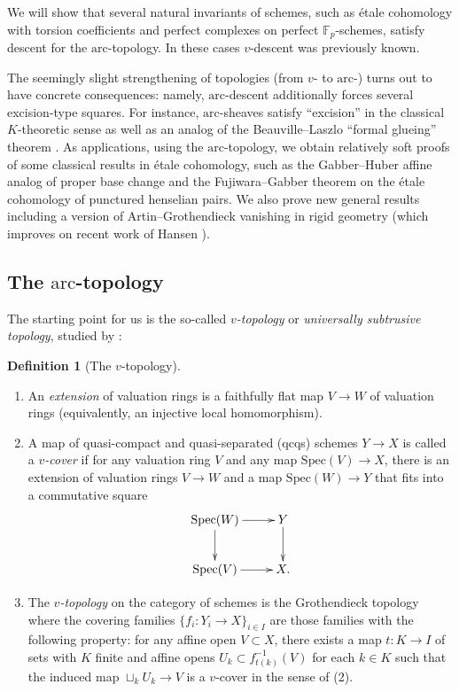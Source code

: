 \documentclass[reqno]{amsart}
\newcommand{\arc}{\mathrm{arc}}
\theoremstyle{definition}
\newtheorem{definition}[theorem]{Definition}
\begin{document}
We will show that several natural invariants of
schemes, such as \'etale cohomology with torsion coefficients and perfect
complexes on perfect $\mathbb{F}_p$-schemes,   
satisfy descent for the $\arc$-topology. In these cases $v$-descent was previously known. 

The seemingly slight strengthening of topologies (from $v$- to $\arc$-)
turns out to have concrete consequences: 
namely, $\arc$-descent additionally forces several excision-type squares.
For instance, $\arc$-sheaves  satisfy ``excision'' in the
classical $K$-theoretic sense as well as an analog of the Beauville--Laszlo ``formal glueing'' theorem \cite{BeauvilleLaszlo}.
As applications, using the $\arc$-topology, we obtain relatively soft proofs of some classical results in \'etale
cohomology, such as the Gabber--Huber affine analog of proper base change and the
Fujiwara--Gabber theorem on the \'etale cohomology of punctured henselian pairs.
We also prove new general results including a version of Artin--Grothendieck vanishing in rigid geometry (which improves on recent work of Hansen \cite{HansenArtin}). 




\subsection{The $\arc$-topology}



The starting point for us is the so-called \emph{$v$-topology} or
\emph{universally subtrusive topology}, studied by \cite{Rydh, BhattScholzeWitt}: 
\begin{definition}[The $v$-topology] 
\label{vcover}
\begin{enumerate}
\item An \emph{extension} of valuation rings is a faithfully flat map $V \to W$ of
valuation rings (equivalently, an injective local homomorphism).

\item A map of quasi-compact and quasi-separated (qcqs) schemes $Y \to X$ is called a \emph{$v$-cover} if 
for any valuation ring $V$ and any map $\mathrm{Spec} (V) \to X$, there is an extension of
valuation rings $V \to W$ and a map $\mathrm{Spec} (W) \to Y$ that fits into a commutative
square
\begin{equation}  
\label{commsquarev} \xymatrix{
\mathrm{Spec} (W) \ar[d] \ar[r] &   Y \ar[d]  \\
\mathrm{Spec} (V) \ar[r] &  X.}
\end{equation}

\item The {\em $v$-topology} on the category of schemes is the Grothendieck
topology where the covering families $\{f_i \colon Y_i \to X\}_{i \in I}$ are those
families with the following property: for any affine open $V \subset X$, there
exists a map $t \colon K \to I$ of sets with $K$ finite and affine opens $U_k \subset f_{t(k)}^{-1}(V)$ for each $k \in K$ such that the induced map $\sqcup_k U_k \to V$ is a $v$-cover in the sense of (2).
\end{enumerate}
\end{definition}
\end{document}
